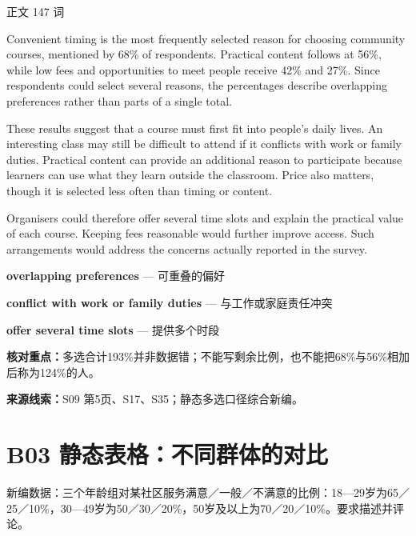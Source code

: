 \documentclass[11pt,a4paper,fontset=macnew]{ctexart}
\newenvironment{example}{\begingroup\fontsize{11}{14.3}\selectfont\setlength{\parskip}{4pt}}{\par\endgroup}
\begin{document}
\par\vspace{4pt}{\bfseries 完整套用示例}\par\nopagebreak
{\small 正文 147 词}\par
\begin{example}
Convenient timing is the most frequently selected reason for choosing community courses, mentioned by 68\% of respondents. Practical content follows at 56\%, while low fees and opportunities to meet people receive 42\% and 27\%. Since respondents could select several reasons, the percentages describe overlapping preferences rather than parts of a single total.

These results suggest that a course must first fit into people's daily lives. An interesting class may still be difficult to attend if it conflicts with work or family duties. Practical content can provide an additional reason to participate because learners can use what they learn outside the classroom. Price also matters, though it is selected less often than timing or content.

Organisers could therefore offer several time slots and explain the practical value of each course. Keeping fees reasonable would further improve access. Such arrangements would address the concerns actually reported in the survey.

\end{example}
\par\vspace{4pt}{\bfseries 好词好句：优先记这三处}\par\nopagebreak
{\small\textbf{overlapping preferences} — 可重叠的偏好}\par
{\small\textbf{conflict with work or family duties} — 与工作或家庭责任冲突}\par
{\small\textbf{offer several time slots} — 提供多个时段}\par
{\small\textbf{核对重点：}多选合计193\%并非数据错；不能写剩余比例，也不能把68\%与56\%相加后称为124\%的人。}\par
{\fontsize{8}{10}\selectfont\textbf{来源线索：}S09 第5页、S17、S35；静态多选口径综合新编。}\par
\clearpage\section*{B03  静态表格：不同群体的对比}
{\small 新编数据：三个年龄组对某社区服务满意／一般／不满意的比例：18—29岁为65／25／10\%，30—49岁为50／30／20\%，50岁及以上为70／20／10\%。要求描述并评论。}\par
\end{document}
